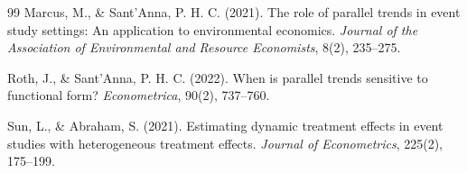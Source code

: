 \documentclass[11pt,a4paper]{article}
\begin{document}
\begin{thebibliography}{99}
Marcus, M., \& Sant'Anna, P. H. C. (2021).
\newblock The role of parallel trends in event study settings: An application to environmental economics.
\newblock \textit{Journal of the Association of Environmental and Resource Economists}, 8(2), 235--275.

Roth, J., \& Sant'Anna, P. H. C. (2022).
\newblock When is parallel trends sensitive to functional form?
\newblock \textit{Econometrica}, 90(2), 737--760.

Sun, L., \& Abraham, S. (2021).
\newblock Estimating dynamic treatment effects in event studies with heterogeneous treatment effects.
\newblock \textit{Journal of Econometrics}, 225(2), 175--199.

\end{thebibliography}
\end{document}
